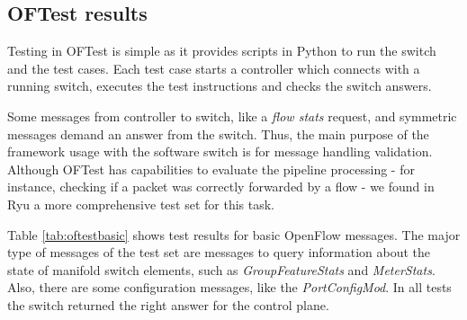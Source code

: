 \subsection{OFTest results}

Testing in OFTest is simple as it provides scripts in Python to run the switch and the test cases. Each test case starts a controller which connects with a running switch, executes the test instructions and checks the switch answers. 

Some messages from controller to switch, like a \textit{flow stats} request, and symmetric messages demand an answer from the switch. Thus, the main purpose of the framework usage with the software switch is for message handling validation. Although OFTest has capabilities to evaluate the pipeline processing - for instance, checking if a packet was correctly forwarded by a flow - we found in Ryu a more comprehensive test set for this task. 

Table \ref{tab:oftestbasic} shows test results for basic OpenFlow messages. The major type of messages of the test set are messages to query information about the state of manifold switch elements, such as \textit{GroupFeatureStats} and \textit{MeterStats}. Also, there are some configuration messages, like the \textit{PortConfigMod}. In all tests the switch returned the right answer for the control plane.


